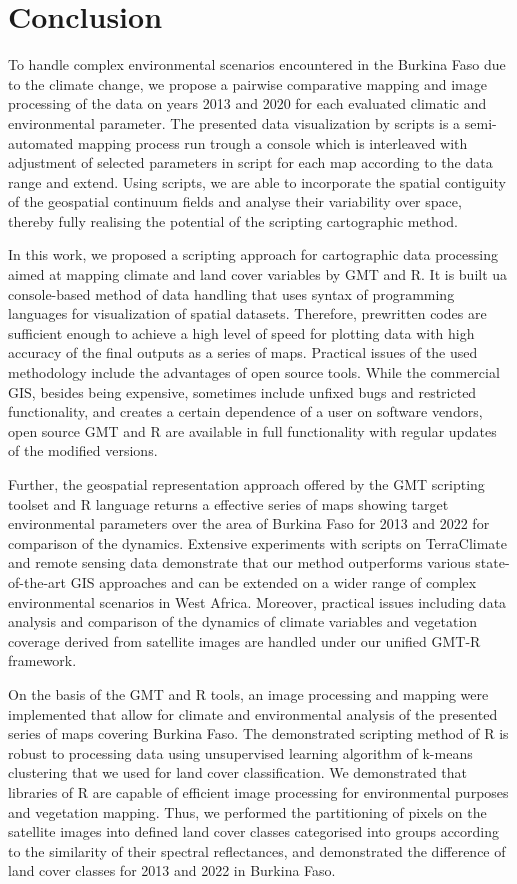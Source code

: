 \documentclass[atmosphere,article,submit,pdftex,moreauthors]{Definitions/mdpi}
\begin{document}
\section{Conclusion}
To handle complex environmental scenarios encountered in the Burkina Faso due to the climate change, we propose a pairwise comparative mapping and image processing of the data on years 2013 and 2020 for each evaluated climatic and environmental parameter. The presented data visualization by scripts is a semi-automated mapping process run trough a console which is interleaved with adjustment of selected parameters in script for each map according to the data range and extend. Using scripts, we are able to incorporate the spatial contiguity of the geospatial continuum fields and analyse their variability over space, thereby fully realising the potential of the scripting cartographic method. 

In this work, we proposed a scripting approach for cartographic data processing aimed at mapping climate and land cover variables by GMT and R. It is built ua console-based method of data handling that uses syntax of programming languages for visualization of spatial datasets. Therefore, prewritten codes are sufficient enough to achieve a high level of speed for plotting data with high accuracy of the final outputs as a series of maps. Practical issues of the used methodology include the advantages of open source tools. While the commercial GIS, besides being expensive, sometimes include unfixed bugs and restricted functionality, and creates a certain dependence of a user on software vendors, open source GMT and R are available in full functionality with regular updates of the modified versions. 

Further, the geospatial representation approach offered by the GMT scripting toolset and R language returns a effective series of maps showing target environmental parameters over the area of Burkina Faso for 2013 and 2022 for comparison of the dynamics. Extensive experiments with scripts on TerraClimate and remote sensing data demonstrate that our method outperforms various state-of-the-art GIS approaches and can be extended on a wider range of complex environmental scenarios in West Africa. Moreover, practical issues including data analysis and comparison of the dynamics of climate variables  and vegetation coverage derived from satellite images are handled under our unified GMT-R framework.

On the basis of the GMT and R tools, an image processing and mapping were implemented that allow for climate and environmental analysis of the presented series of maps covering Burkina Faso. The demonstrated scripting method of R is robust to processing data using unsupervised learning algorithm of k-means clustering that we used for land cover classification. We demonstrated that libraries of R are capable of efficient image processing for environmental purposes and vegetation mapping. Thus, we performed the partitioning of pixels on the satellite images into defined land cover classes categorised into groups according to the similarity of their spectral reflectances, and demonstrated the difference of land cover classes for 2013 and 2022 in Burkina Faso.
\end{document}
